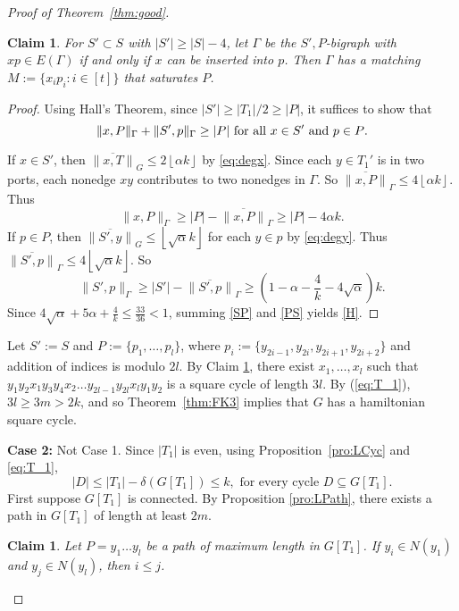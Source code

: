 \documentclass[oneside,12pt]{memoir}
\newtheorem{claim}[theorem]{Claim}
\newcommand{\floor}[1]{\left\lfloor#1\right\rfloor}
\begin{document}
\begin{proof}[Proof of Theorem~\ref{thm:good}]
\begin{claim}\label{ports}
For $S'\subset S$ with $|S'|\ge |S|-4$, let $\Gamma$ be the $S',P$-bigraph with $xp\in E(\Gamma)$ if and only if $x$ can be inserted into $p$. Then $\Gamma$ has a matching $M:=\{x_{i}p_{i}:i\in[t]\}$ that saturates $P$.
\end{claim}

\begin{proof}

Using Hall's Theorem, since $|S'|\geq |T_1|/2\geq |P|$, it suffices to show that  %
\begin{equation}
\|x,P\|_{\Gamma}+\|S',p\|_{\Gamma}\ge|P|\textrm{ for all \ensuremath{x\in S' } and \ensuremath{p\in P}.}\label{H}\end{equation} 

If $x\in S'$, then $\overline{\|x,T\|}_{G}\leq 2\floor{\alpha k}$ by \eqref{eq:degx}.
Since each $y\in T_1'$ is in two ports, each nonedge $xy$ contributes
to two nonedges in $\Gamma$. So $\overline{\|x,P\|}_{\Gamma}\leq 4\floor{\alpha k}$.
Thus \begin{equation}
\|x,P\|_{\Gamma}\geq|P|-\overline{\|x,P\|}_{\Gamma}\geq |P|-4\alpha k.\label{SP}\end{equation}
 If $p\in P$, then $\overline{\|S',y\|}_{G}\leq \floor{\sqrt{\alpha}k}$ for each
$y\in p$ by \eqref{eq:degy}. Thus $\overline{\|S',p\|}_{\Gamma}\leq 4\floor{\sqrt{\alpha}k}$. 
So\begin{equation}
\|S',p\|_{\Gamma}\geq|S'|-\overline{\|S',p\|}_{\Gamma}\ge (1-\alpha-\frac{4}{k}-4\sqrt{\alpha})k.\label{PS}\end{equation}
Since $4\sqrt{\alpha}+5\alpha+\frac{4}{k}\leq \frac{33}{36}< 1$, summing \eqref{SP} and \eqref{PS} %
yields \eqref{H}.
\end{proof}

Let $S':=S$ and $P:=\{p_{1},\dots,p_{l}\}$, where $p_{i}:=\{y_{2i-1},y_{2i},y_{2i+1},y_{2i+2}\}$ and addition of indices is modulo $2l$. 
By Claim \ref{ports}, there exist $x_{1}, \dots, x_l$ such that $y_{1}y_{2}x_{1}y_{3}y_{4}x_{2}\dots y_{2l-1}y_{2l}x_{l}y_{1}y_{2}$
is a square cycle of length $3l$. By (\ref{eq:T_1}), $3l\geq 3m>2k$, and so Theorem~\ref{thm:FK3} implies that $G$ has a hamiltonian square
cycle.

\noindent 
\textbf{Case 2:} Not Case 1. Since $|T_1|$ is even, using Proposition~\ref{pro:LCyc} and \eqref{eq:T_1}, 
 \begin{equation}
|D|\leq|T_{1}|-\delta(G[T_{1}])\leq k,\text{ for every cycle }D\subseteq G[T_{1}].\label{eq:con}\end{equation}
First suppose $G[T_{1}]$ is connected.  By Proposition \ref{pro:LPath}, there exists a path in $G[T_1]$ of length at least $2m$.
\begin{claim}\label{nocross}
Let $P=y_1\dots y_l$ be a path of maximum length in $G[T_1]$.  If $y_i\in N(y_1)$ and $y_j\in N(y_l)$, then $i\leq j$.
\end{claim}


\end{proof}
\end{document}
